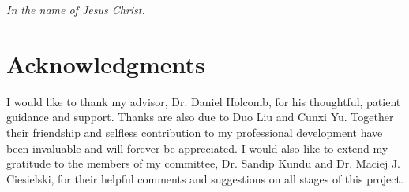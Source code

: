 \documentclass[proposal]{umassthesis}  %
\begin{document}
\begin{dedication}              %
  \begin{center}
    \emph{In the name of Jesus Christ.}
  \end{center}
\end{dedication}

%
%
%

\chapter{Acknowledgments}             %
I would like to thank my advisor, Dr. Daniel Holcomb, for his thoughtful, patient guidance and support. Thanks are also due to Duo Liu and Cunxi Yu. Together their friendship and selfless contribution to my professional development have been invaluable and will forever be appreciated. I would also like to extend my gratitude to the members of my committee, Dr. Sandip Kundu and Dr. Maciej J. Ciesielski, for their helpful comments and suggestions on all stages of this project.\\
\end{document}
